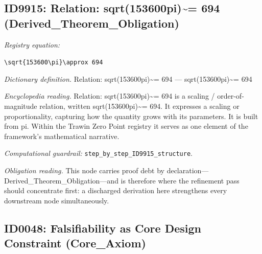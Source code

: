 \documentclass[11pt]{article}
\theoremstyle{remark}
\begin{document}
\subsection{ID9915: Relation: sqrt(153600pi)\textasciitilde{}= 694 (Derived\_Theorem\_Obligation)}

\noindent\textit{Registry equation:}\par
{\small\texttt{\textbackslash{}sqrt\{153600\textbackslash{}pi\}\textbackslash{}approx 694}}\par\medskip
\noindent\textit{Dictionary definition.} Relation: sqrt(153600pi)\textasciitilde{}= 694 --- sqrt(153600pi)\textasciitilde{}= 694\par\medskip
\noindent\textit{Encyclopedia reading.} Relation: sqrt(153600pi)\textasciitilde{}= 694 is a scaling / order-of-magnitude relation, written sqrt(153600pi)\textasciitilde{}= 694. It expresses a scaling or proportionality, capturing how the quantity grows with its parameters. It is built from pi. Within the Trawin Zero Point registry it serves as one element of the framework's mathematical narrative.
\par\medskip\noindent\textit{Computational guardrail:} \texttt{step\_by\_step\_ID9915\_structure}.
\par\medskip\noindent\textit{Obligation reading.} This node carries proof debt by declaration---Derived\_Theorem\_Obligation---and is therefore where the refinement pass should concentrate first: a discharged derivation here strengthens every downstream node simultaneously.

\subsection{ID0048: Falsifiability as Core Design Constraint (Core\_Axiom)}
\end{document}
